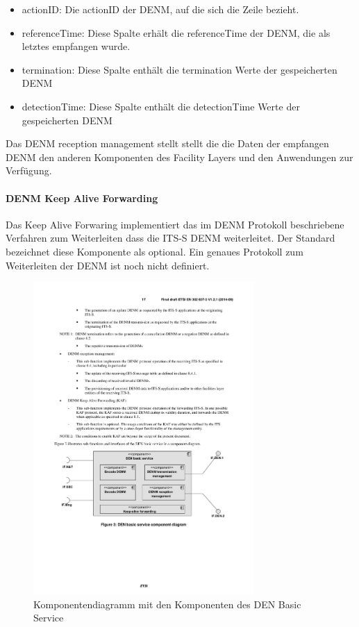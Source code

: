 \begin{itemize}
	\item actionID: Die actionID der \ac{DENM}, auf die sich die Zeile bezieht.
	\item referenceTime: Diese Spalte erhält die referenceTime der \ac{DENM}, die als letztes empfangen wurde. 
	\item termination: Diese Spalte enthält die termination Werte der gespeicherten \ac{DENM}
	\item detectionTime: Diese Spalte enthält die detectionTime Werte der gespeicherten \ac{DENM}
\end{itemize}
 
Das \ac{DENM} reception management stellt stellt die die Daten der empfangen \ac{DENM} den anderen Komponenten des Facility Layers und den Anwendungen zur Verfügung.

\paragraph{DENM Keep Alive Forwarding}
Das Keep Alive Forwaring implementiert das im \ac{DENM} Protokoll beschriebene Verfahren zum Weiterleiten dass die \ac{ITS-S} \ac{DENM} weiterleitet. Der Standard \cite{en302637-3} bezeichnet diese Komponente als optional. Ein genaues Protokoll zum Weiterleiten der \ac{DENM} ist noch nicht definiert.




\begin{figure}[htbp]
	\includegraphics[width=0.75\textwidth]{content/images/04_facilitylayer/denBasicServiceKomponenten.pdf}
	\caption{Komponentendiagramm mit den Komponenten des DEN Basic Service \cite{en302637-3}}
	\label{fig:darstellungDenBasicServiceKomponenten}
\end{figure}

